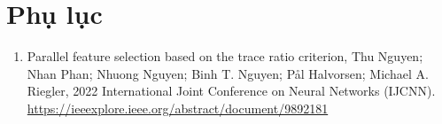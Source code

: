 \chapter*{Phụ lục}
\pagestyle{fancy}
\lhead{}

\rhead{}
\begin{enumerate}
	\item Parallel feature selection based on the trace ratio criterion, Thu Nguyen; Nhan Phan; Nhuong Nguyen; Binh T. Nguyen; Pål Halvorsen; Michael A. Riegler, 2022 International Joint Conference on Neural Networks (IJCNN). \\
	\url{https://ieeexplore.ieee.org/abstract/document/9892181}
\end{enumerate}

\lfoot{}
\cfoot{\thepage}
\rfoot{}

\restoregeometry